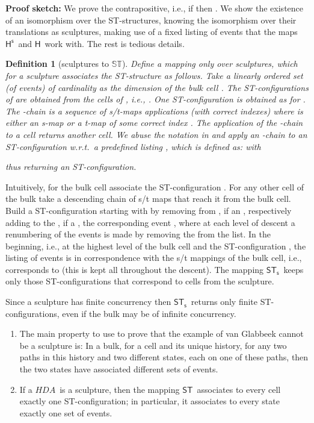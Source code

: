 \documentclass[submission,copyright,creativecommons]{eptcs}
\newtheorem{definition}[theorem]{Definition}
\newenvironment{proof}[1][\!\!\,]{\vspace{1ex}\noindent\textbf{Proof #1: }}{\hfill\vspace{2ex}}
\newcommand{\cp}[1]{}
\newcommand\HDA{\ensuremath{\mathit{HDA}}}
\newcommand\allST{\ensuremath{\mathbb{ST}}}
\newcommand\stintoh{\ensuremath{\mathsf{H}}}
\newcommand\stintosculpture{\ensuremath{\stintoh^{\mathsf{s}}}}
\newcommand\hintost{\ensuremath{\mathsf{ST}}}
\newcommand\sculpintost{\ensuremath{\mathsf{ST}_{\!\mathsf{s}}}}
\begin{document}
\begin{proof}[sketch]
We prove the contrapositive, i.e., if  then . We show the existence of an isomorphism over the ST-structures, knowing the isomorphism over their translations as sculptures, making use of a fixed listing of events that the maps \stintosculpture\ and \stintoh\ work with.
The rest is tedious details.
\end{proof}


\begin{definition}[sculptures to \allST]\label{def_sculptures_to_ST}
Define a mapping  only over sculptures, which for a sculpture  associates the ST-structure  as follows.
Take a linearly ordered set  (of events) of cardinality as the dimension of the bulk cell . The ST-configurations of  are obtained from the cells of , i.e., .
One ST-configuration  is obtained as  for . The \emph{-chain}  is a sequence of s/t-maps applications (with correct indexes)  where  is either an s-map or a t-map of some correct index . The application of the -chain to a cell returns another cell. We abuse the notation in  and apply an -chain to an ST-configuration w.r.t.\ a predefined listing , which is defined as:  with 

thus returning an ST-configuration.

\end{definition}

Intuitively, for the bulk cell  associate the ST-configuration . For any other cell  of the bulk take a descending chain of s/t maps that reach it from the bulk cell. Build a ST-configuration  starting with  by removing from , if an , respectively adding to the , if a , the corresponding event , where at each level of descent a renumbering of the events is made by removing the  from the list. In the beginning, i.e., at the highest level of the bulk cell and the ST-configuration , the listing of events is in correspondence with the s/t mappings of the bulk cell, i.e.,  corresponds to  (this is kept all throughout the descent).
The mapping \sculpintost\ keeps only those ST-configurations that correspond to cells from the sculpture.

Since a sculpture has finite concurrency then \sculpintost\ returns only finite ST-configurations, even if the bulk may be of infinite concurrency.

\cp{Prove the next!}
\begin{enumerate}
\item The main property to use to prove that the example of van Glabbeek cannot be a sculpture is: In a bulk, for a cell and its unique history, for any two paths in this history and two different states, each on one of these paths, then the two states have associated different sets of events.

\item If a \HDA\ is a sculpture, then the mapping \hintost\ associates to every cell exactly one ST-configuration; in particular, it associates to every state exactly one set of events.

\end{enumerate}
\end{document}
